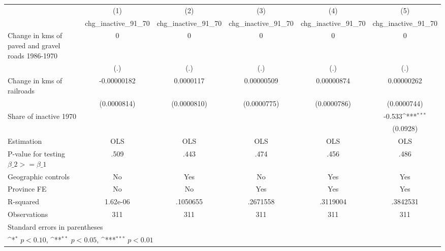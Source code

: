 {
\def\sym#1{\ifmmode^{#1}\else\(^{#1}\)\fi}
\begin{tabular}{l*{5}{c}}
\hline\hline
                    &\multicolumn{1}{c}{(1)}&\multicolumn{1}{c}{(2)}&\multicolumn{1}{c}{(3)}&\multicolumn{1}{c}{(4)}&\multicolumn{1}{c}{(5)}\\
                    &\multicolumn{1}{c}{chg\_inactive\_91\_70}&\multicolumn{1}{c}{chg\_inactive\_91\_70}&\multicolumn{1}{c}{chg\_inactive\_91\_70}&\multicolumn{1}{c}{chg\_inactive\_91\_70}&\multicolumn{1}{c}{chg\_inactive\_91\_70}\\
\hline
Change in kms of paved and gravel roads 1986-1970&           0         &           0         &           0         &           0         &           0         \\
                    &         (.)         &         (.)         &         (.)         &         (.)         &         (.)         \\
[1em]
Change in kms of railroads& -0.00000182         &   0.0000117         &  0.00000509         &  0.00000874         &  0.00000262         \\
                    & (0.0000814)         & (0.0000810)         & (0.0000775)         & (0.0000786)         & (0.0000744)         \\
[1em]
Share of inactive 1970&                     &                     &                     &                     &      -0.533\sym{***}\\
                    &                     &                     &                     &                     &    (0.0928)         \\
\hline
Estimation          &         OLS         &         OLS         &         OLS         &         OLS         &         OLS         \\
P-value for testing $\beta\_2 >= \beta\_1$&        .509         &        .443         &        .474         &        .456         &        .486         \\
Geographic controls &          No         &         Yes         &          No         &         Yes         &         Yes         \\
Province FE         &          No         &          No         &         Yes         &         Yes         &         Yes         \\
R-squared           &    1.62e-06         &    .1050655         &    .2671558         &    .3119004         &    .3842531         \\
Observations        &         311         &         311         &         311         &         311         &         311         \\
\hline\hline
\multicolumn{6}{l}{\footnotesize Standard errors in parentheses}\\
\multicolumn{6}{l}{\footnotesize \sym{*} \(p<0.10\), \sym{**} \(p<0.05\), \sym{***} \(p<0.01\)}\\
\end{tabular}
}

